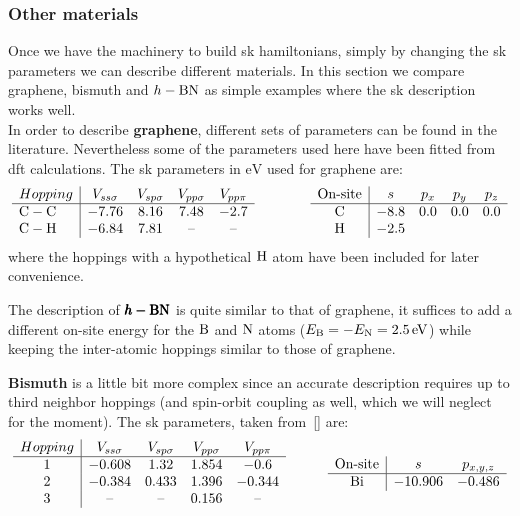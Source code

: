 \subsubsection{Other materials}
Once we have the machinery to build \ac{sk} hamiltonians, simply by changing the \ac{sk} parameters we can describe different materials.
In this section we compare graphene, bismuth and $h-\ce{BN}$  %
as simple examples where the \ac{sk} description works well.\\

%
%
In order to describe \textbf{graphene}, different sets of parameters can be found in the literature\cite{Gosalbez-Martinez2011, Konschuh2010, Saito1998}. Nevertheless some of the parameters used here have been fitted from \ac{dft} calculations. The \ac{sk} parameters in $\si{\eV}$ used for graphene are:
\begin{equation}
  \begin{array}{l|cccc}
    Hopping & V_{ss\sigma} & V_{sp\sigma} & V_{pp\sigma} & V_{pp\pi} \\ \hline
    \ce{C}-\ce{C} & -7.76 & 8.16 & 7.48 & -2.7 \\
    \ce{C}-\ce{H} & -6.84 & 7.81 & \text{--} & \text{--}
  \end{array}\qquad\qquad
  \begin{array}{c|cccc}
    \text{On-site} & s & p_x & p_y & p_z \\ \hline
    \ce{C} & -8.8 & 0.0 & 0.0 & 0.0 \\
    \ce{H} & -2.5 &     &     &
  \end{array}
\label{G_SK_params}
\end{equation}
where the hoppings with a hypothetical $\ce{H}$ atom have been included for later convenience.
\medbreak

The description of $\pmb{h-\ce{BN}}$ is quite similar to that of graphene, it suffices to add a different on-site energy for the $\ce{B}$ and $\ce{N}$ atoms ($E_{\ce{B}} = -E_{\ce{N}} =\SI{2.5}{\eV}$) while keeping the inter-atomic hoppings similar to those of graphene.
\medbreak

\textbf{Bismuth} is a little bit more complex since an accurate description requires up to third neighbor hoppings (and spin-orbit coupling as well, which we will neglect for the moment). The \ac{sk} parameters, taken from~[] are:
\begin{equation}
  \begin{array}{c|cccc}
    Hopping & V_{ss\sigma} & V_{sp\sigma} & V_{pp\sigma} & V_{pp\pi} \\ \hline
    1 & -0.608 & 1.32 & 1.854 & -0.6 \\
    2 & -0.384 & 0.433 & 1.396 & -0.344 \\
    3 & \text{--} & \text{--} & 0.156 & \text{--}
  \end{array}\quad\qquad
  \begin{array}{c|cc}
     \text{On-site} & s & p_{x,y,z} \\ \hline
    \ce{Bi} & -10.906 & -0.486
  \end{array}
\label{Bi_SK_params}
\end{equation}
\medbreak

